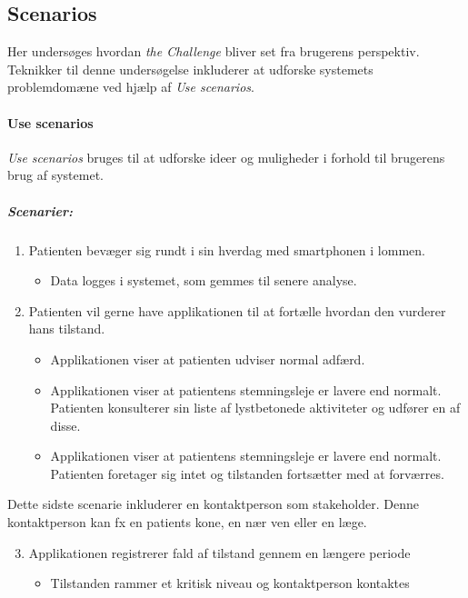 \subsection{Scenarios}
Her undersøges hvordan \textit{the Challenge} bliver set fra brugerens perspektiv.
Teknikker til denne undersøgelse inkluderer at udforske systemets problemdomæne ved hjælp af \textit{Use scenarios}.

\paragraph{Use scenarios}
\textit{Use scenarios} bruges til at udforske ideer og muligheder i forhold til brugerens brug af systemet.

\subparagraph{Scenarier:}
\begin{enumerate}
	\item Patienten bevæger sig rundt i sin hverdag med smartphonen i lommen. \label{hverdag}
	\begin{itemize}
		\item Data logges i systemet, som gemmes til senere analyse.
	\end{itemize}
	
	\item Patienten vil gerne have applikationen til at fortælle hvordan den vurderer hans tilstand. \label{vurder}
	\begin{itemize}
		\item Applikationen viser at patienten udviser normal adfærd.
		\item Applikationen viser at patientens stemningsleje er lavere end normalt.
		Patienten konsulterer sin liste af lystbetonede aktiviteter og udfører en af disse.
		\item Applikationen viser at patientens stemningsleje er lavere end normalt.
		Patienten foretager sig intet og tilstanden fortsætter med at forværres.
	\end{itemize}
\end{enumerate}
Dette sidste scenarie inkluderer en kontaktperson som stakeholder.
Denne kontaktperson kan fx en patients kone, en nær ven eller en læge. 
\begin{enumerate}
	\setcounter{enumi}{2}
	\item Applikationen registrerer fald af tilstand gennem en længere periode \label{fald}
	\begin{itemize}
		\item Tilstanden rammer et kritisk niveau og kontaktperson kontaktes
	\end{itemize}
\end{enumerate}


